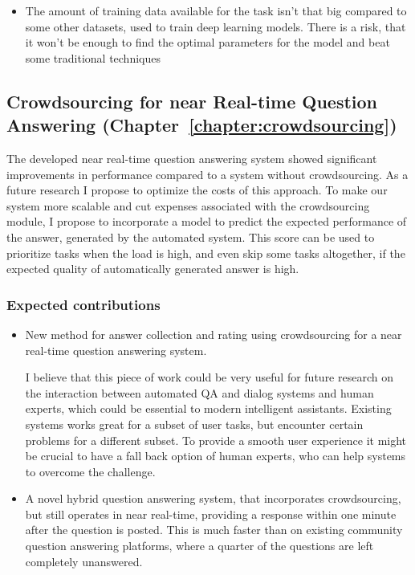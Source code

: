 \begin{itemize}
\item The amount of training data available for the task isn't that big compared to some other datasets, used to train deep learning models. There is a risk, that it won't be enough to find the optimal parameters for the model and beat some traditional techniques
\end{itemize}

\subsection{Crowdsourcing for near Real-time Question Answering (Chapter~\ref{chapter:crowdsourcing})}
\label{section:proposal:plan:crowdsourcing}

The developed near real-time question answering system showed significant improvements in performance compared to a system without crowdsourcing.
As a future research I propose to optimize the costs of this approach.
To make our system more scalable and cut expenses associated with the crowdsourcing module, I propose to incorporate a model to predict the expected performance of the answer, generated by the automated system.
This score can be used to prioritize tasks when the load is high, and even skip some tasks altogether, if the expected quality of automatically generated answer is high.

\subsubsection{Expected contributions}
\label{section:proposal:plan:crowdsourcing:contributions}

\begin{itemize}
\item New method for answer collection and rating using crowdsourcing for a near real-time question answering system.

I believe that this piece of work could be very useful for future research on the interaction between automated QA and dialog systems and human experts, which could be essential to modern intelligent assistants.
Existing systems works great for a subset of user tasks, but encounter certain problems for a different subset.
To provide a smooth user experience it might be crucial to have a fall back option of human experts, who can help systems to overcome the challenge.

\item A novel hybrid question answering system, that incorporates crowdsourcing, but still operates in near real-time, \ie providing a response within one minute after the question is posted.
This is much faster than on existing community question answering platforms, where a quarter of the questions are left completely unanswered.
\end{itemize}

